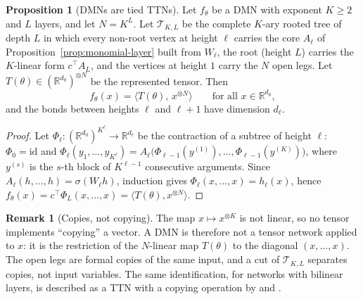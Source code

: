 \documentclass[11pt]{article}
\newcommand{\R}{\mathbb{R}}
\newcommand{\ip}[2]{\langle #1,#2\rangle}
\theoremstyle{definition}
\newtheorem{proposition}[theorem]{Proposition}
\newtheorem{remark}[theorem]{Remark}
\numberwithin{equation}{section}
\begin{document}
\begin{proposition}[DMNs are tied TTNs]\label{prop:dmn}
Let $f_\theta$ be a DMN with exponent $K\ge2$ and $L$ layers, and let $N=K^L$. Let $\mathcal T_{K,L}$ be the complete $K$-ary rooted tree of depth $L$ in which every non-root vertex at height $\ell$ carries the core $A_\ell$ of Proposition~\ref{prop:monomial-layer} built from $W_\ell$, the root (height $L$) carries the $K$-linear form $c^\top A_L$, and the vertices at height $1$ carry the $N$ open legs. Let $T(\theta)\in(\R^{d_0})^{\otimes N}$ be the represented tensor. Then
\[
f_\theta(x)=\big\langle T(\theta),\,x^{\otimes N}\big\rangle\qquad\text{for all }x\in\R^{d_0},
\]
and the bonds between heights $\ell$ and $\ell+1$ have dimension $d_\ell$.
\end{proposition}

\begin{proof}
Let $\Phi_\ell:(\R^{d_0})^{K^\ell}\to\R^{d_\ell}$ be the contraction of a subtree of height $\ell$: $\Phi_0=\mathrm{id}$ and $\Phi_\ell(y_1,\dots,y_{K^\ell})=A_\ell\big(\Phi_{\ell-1}(y^{(1)}),\dots,\Phi_{\ell-1}(y^{(K)})\big)$, where $y^{(s)}$ is the $s$-th block of $K^{\ell-1}$ consecutive arguments. Since $A_\ell(h,\dots,h)=\sigma(W_\ell h)$, induction gives $\Phi_\ell(x,\dots,x)=h_\ell(x)$, hence $f_\theta(x)=c^\top\Phi_L(x,\dots,x)=\ip{T(\theta)}{x^{\otimes N}}$.
\end{proof}

\begin{remark}[Copies, not copying]\label{rem:copies}
The map $x\mapsto x^{\otimes K}$ is not linear, so no tensor implements ``copying'' a vector. A DMN is therefore not a tensor network applied to $x$: it is the restriction of the $N$-linear map $T(\theta)$ to the diagonal $(x,\dots,x)$. The open legs are formal copies of the same input, and a cut of $\mathcal T_{K,L}$ separates copies, not input variables. The same identification, for networks with bilinear layers, is described as a TTN with a copying operation by \citet{pearce2024bilinear} and \citet{dooms2025compositionality} \citep[see][Section~2]{furman2026benign}.
\end{remark}
\end{document}
